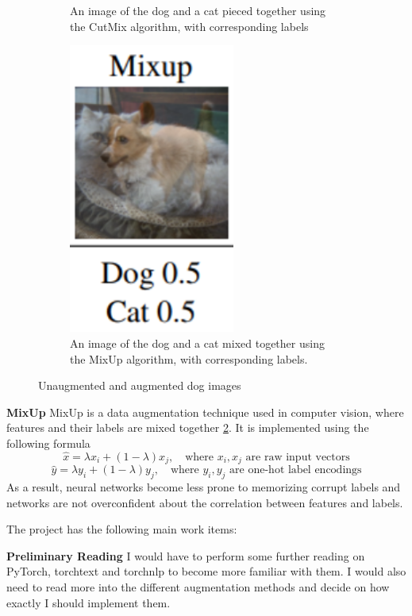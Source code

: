 \documentclass[60pt]{article}
\begin{document}
\begin{figure}[!h]
\begin{subfigure}[t]{0.3\textwidth}
        \caption{An image of the dog and a cat pieced together using the CutMix algorithm, with corresponding labels}
        \label{fig:cutmix}
    \end{subfigure}
    \hfill
    \begin{subfigure}[t]{0.3\textwidth}
        \centering
        \includegraphics[width=0.6\textwidth]{mixup.png}
        \caption{An image of the dog and a cat mixed together using the MixUp algorithm, with corresponding labels.}
        \label{fig:mixup}
    \end{subfigure}
    \caption{Unaugmented and augmented dog images}
    \label{fig:dog images}
\end{figure}
\newpage
\par
\textbf{MixUp} MixUp is a data augmentation technique used in computer vision, where features and their labels are mixed together \ref{fig:mixup}. It is implemented using the following formula
\[\hat{x} = \lambda x_i + (1-\lambda)x_j, \quad \text{where }x_i,x_j \text{ are raw input vectors}\]
\[\hat{y} = \lambda y_i + (1-\lambda)y_j, \quad \text{where }y_i,y_j \text{ are one-hot label encodings}\]
As a result, neural networks become less prone to memorizing corrupt labels and networks are not overconfident about the correlation between features and labels.
\par
The project has the following main work items:
\par
\textbf{Preliminary Reading} I would have to perform some further reading on PyTorch, torchtext and torchnlp to become more familiar with them. I would also need to read more into the different augmentation methods and decide on how exactly I should implement them.
\par 
\end{document}
